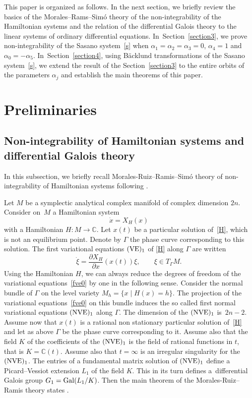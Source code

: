 \documentclass[pdftex]{sigma}
\numberwithin{equation}{section}
\begin{document}
 This paper is organized as follows. In the next section, we briefly review the basics of the Morales--Rams--Sim\'{o} theory
 of the non-integrability of the Hamiltonian systems and the relation of the differential Galois theory to the linear
 systems of ordinary differential equations. In~Section~\ref{section3}, we prove non-integrability of the Sasano system~\eqref{s} when
 $\alpha_1=\alpha_2=\alpha_3=0$, $\alpha_4=1$ and $\alpha_0=-\alpha_5$. In~Section~\ref{section4}, using B\"{a}cklund transformations
 of the Sasano system~\eqref{s}, we extend the result of the Section~\ref{section3} to the entire orbits of the parameters $\alpha_j$
 and establish the main theorems of this paper.

 \section{Preliminaries}

 \subsection{Non-integrability of Hamiltonian systems and differential Galois theory}
 In this subsection, we briefly recall Morales-Ruiz--Ramis--Sim\'{o} theory of non-integrability of Hamiltonian systems following
 \cite{MR,MR2, MR1, MRS}.

Let $M$ be a symplectic analytical complex manifold of complex dimension $2 n$. Consider on~$M$ a Hamiltonian system
 \begin{equation}
 \dot{x}=X_H(x)\label{H}
 \end{equation}
 with a Hamiltonian $H \colon M \rightarrow \mathbb{C}$. Let $x(t)$ be a particular solution of~\eqref{H}, which is not an equilibrium point.
 Denote by $\Gamma$ the phase curve corresponding to this solution. The first variational equations $({\rm VE})_1$ of
 \eqref{H} along $\Gamma$ are written
 \begin{equation}
 \dot{\xi}=\frac{\partial X_H}{\partial x} (x(t)) \xi,\qquad \xi\in T_{\Gamma}M .\label{fve0}
 \end{equation}
 Using the Hamiltonian $H$, we can always reduce the degrees of freedom of the variational equations~\eqref{fve0} by one in the
 following sense. Consider the normal bundle of $\Gamma$ on the level variety $M_h=\{ x \mid H(x)=h\}$. The projection of the
 variational equations~\eqref{fve0} on this bundle induces the so called first normal variational equations $({\rm NVE})_1$ along $\Gamma$.
 The dimension of the $({\rm NVE})_1$ is~${2 n-2}$. Assume now that $x(t)$ is a rational non stationary particular solution of~\eqref{H} and let as above
 $\Gamma$ be the phase curve corresponding to it. Assume also that the field $K$ of the coefficients of the $({\rm NVE})_1$ is the field of rational functions in $t$,
 that is $K=\mathbb{C}(t)$. Assume also that $t=\infty$ is an irregular singularity for the $({\rm NVE})_1$.
 The entries of a fundamental matrix solution of $({\rm NVE})_1$ define a Picard--Vessiot extension $L_1$ of the field $K$.
 This in its turn defines a~differential Galois group
 $G_1={\rm Gal}(L_1/K)$.
 Then the main theorem of the Morales-Ruiz--Ramis theory states \cite{MR, MR2, MRS}.
\end{document}

